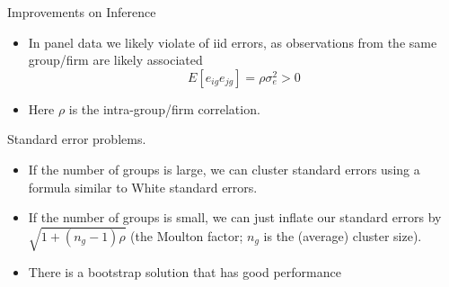 \documentclass[aspectratio=169, handout]{beamer}
\numberwithin{equation}{section}
\begin{document}
\begin{frame}{Improvements on Inference}
\begin{itemize}
\item In panel data we likely violate of iid errors, as observations from the same group/firm are likely associated
$$E[e_{ig}e_{jg}]=\rho\sigma^2_e>0 $$
\item Here $\rho$ is the intra-group/firm correlation.
\end{itemize}
\end{frame}
%


\begin{frame}{Standard error problems.}
\begin{itemize}
\item If the number of groups is large, we can cluster standard errors using a formula similar to White standard errors.\pause
\item If the number of groups is small, we can just inflate our standard errors by $\sqrt{1+(n_g-1)\rho}$ (the Moulton factor; $n_g$ is the (average) cluster size).\pause
\item There is a bootstrap solution that has good performance
\end{itemize}
\end{frame}
\end{document}

